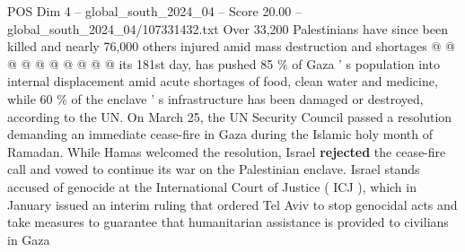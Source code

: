 \begin{textsample}{POS Dim 4 – global\_south\_2024\_04 – Score 20.00 – global\_south\_2024\_04/107331432.txt}
Over 33,200 Palestinians have since been killed and nearly 76,000 others injured amid mass destruction and shortages @ @ @ @ @ @ @ @ @ @ its 181st day, has pushed 85 \% of Gaza ' s population into internal displacement amid acute shortages of food, clean water and medicine, while 60 \% of the enclave ' s infrastructure has been damaged or destroyed, according to the UN.
On March 25, the UN Security Council passed a resolution demanding an immediate cease-fire in Gaza during the Islamic holy month of Ramadan.
While Hamas welcomed the resolution, Israel \textbf{rejected} the cease-fire call and vowed to continue its war on the Palestinian enclave.
Israel stands accused of genocide at the International Court of Justice ( ICJ ), which in January issued an interim ruling that ordered Tel Aviv to stop genocidal acts and take measures to guarantee that humanitarian assistance is provided to civilians in Gaza

\end{textsample}
